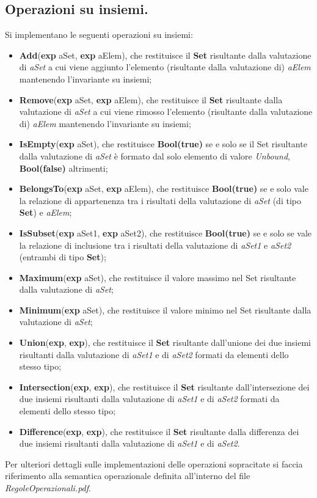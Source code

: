 \documentclass[10pt, italian, openany]{book}
\begin{document}
\subsection*{Operazioni su insiemi.}
Si implementano le seguenti operazioni su insiemi:
\begin{itemize}
\item \textbf{Add}(\textbf{exp} aSet, \textbf{exp} aElem), che restituisce il \textbf{Set} risultante dalla valutazione di \textit{aSet} a cui viene aggiunto l'elemento (risultante dalla valutazione di) \textit{aElem} mantenendo l'invariante su insiemi;
\item \textbf{Remove}(\textbf{exp} aSet, \textbf{exp} aElem), che restituisce il \textbf{Set} risultante dalla valutazione di \textit{aSet} a cui viene rimosso l'elemento (risultante dalla valutazione di) \textit{aElem} mantenendo l'invariante su insiemi;
\item \textbf{IsEmpty}(\textbf{exp} aSet), che restituisce \textbf{Bool(true)} se e solo se il Set risultante dalla valutazione di \textit{aSet} \`e formato dal solo elemento di valore \textit{Unbound}, \textbf{Bool(false)} altrimenti;
\item \textbf{BelongsTo}(\textbf{exp} aSet, \textbf{exp} aElem), che restituisce \textbf{Bool(true)} se e solo vale la relazione di appartenenza tra i risultati della valutazione di \textit{aSet} (di tipo \textbf{Set}) e \textit{aElem};
\item \textbf{IsSubset}(\textbf{exp} aSet1, \textbf{exp} aSet2), che restituisce \textbf{Bool(true)} se e solo se vale la relazione di inclusione tra i risultati della valutazione di \textit{aSet1} e \textit{aSet2} (entrambi di tipo \textbf{Set});
\item \textbf{Maximum}(\textbf{exp} aSet), che restituisce il valore massimo nel Set risultante dalla valutazione di \textit{aSet};
\item \textbf{Minimum}(\textbf{exp} aSet), che restituisce il valore minimo nel Set risultante dalla valutazione di \textit{aSet};
\item \textbf{Union}(\textbf{exp}, \textbf{exp}), che restituisce il \textbf{Set} risultante dall'unione dei due insiemi risultanti dalla valutazione di \textit{aSet1} e di \textit{aSet2} formati da elementi dello stesso tipo;
\item \textbf{Intersection}(\textbf{exp}, \textbf{exp}), che restituisce il \textbf{Set} risultante dall'intersezione dei due insiemi risultanti dalla valutazione di \textit{aSet1} e di \textit{aSet2} formati da elementi dello stesso tipo;
\item \textbf{Difference}(\textbf{exp}, \textbf{exp}), che restituisce il \textbf{Set} risultante dalla differenza dei due insiemi risultanti dalla valutazione di \textit{aSet1} e di \textit{aSet2}.
\end{itemize}
Per ulteriori dettagli sulle implementazioni delle operazioni sopracitate si faccia riferimento alla semantica operazionale definita all'interno del file \textit{RegoleOperazionali.pdf}.
\end{document}
